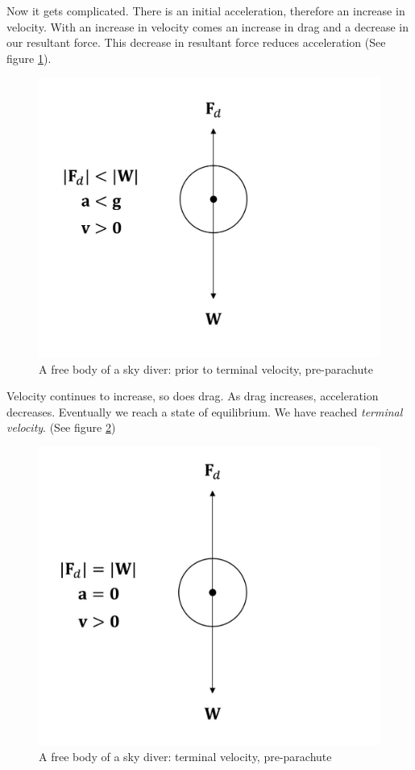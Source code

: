 Now it gets complicated. There is an initial acceleration, therefore an increase in velocity. With an increase in velocity comes an increase in drag and a decrease in our resultant force. This decrease in resultant force reduces acceleration (See figure \ref{fig:terminal-velocity-2}). 
\begin{figure}[h!]
    \centering
    \includegraphics[scale=0.3]{notes/images/Terminal-Velocity-2.JPG}
    \caption{A free body of a sky diver: prior to terminal velocity, pre-parachute }
    \label{fig:terminal-velocity-2}
\end{figure}
\FloatBarrier
Velocity continues to increase, so does drag. As drag increases, acceleration decreases. Eventually we reach a state of equilibrium. We have reached \textit{terminal velocity}. (See figure \ref{fig:terminal-velocity-3})
\begin{figure}[h!]
    \centering
    \includegraphics[scale=0.3]{notes/images/Terminal-Velocity-3.JPG}
    \caption{A free body of a sky diver: terminal velocity, pre-parachute }
    \label{fig:terminal-velocity-3}
\end{figure}

